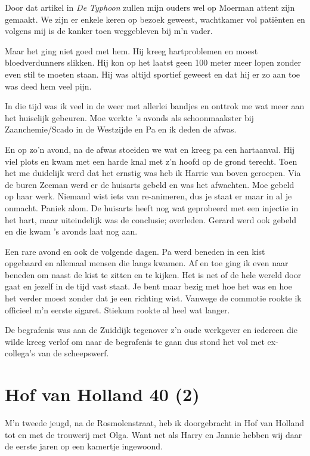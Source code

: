 \documentclass[10pt,twoside,openright]{memoir}
\begin{document}
Door dat artikel in \emph{De Typhoon} zullen mijn ouders wel op Moerman attent zijn gemaakt. We zijn er enkele keren op bezoek geweest, wachtkamer vol patiënten en volgens mij is de kanker toen weggebleven bij m’n vader. 

Maar het ging niet goed met hem. Hij kreeg hartproblemen en moest bloedverdunners slikken. Hij kon op het laatst geen 100 meter meer lopen zonder even stil te moeten staan. Hij was altijd sportief geweest en dat hij er zo aan toe was deed hem veel pijn.

In die tijd was ik veel in de weer met allerlei bandjes en onttrok me wat meer aan het huiselijk gebeuren. Moe werkte ’s avonds als schoonmaakster bij Zaanchemie/Scado in de Westzijde en Pa en ik deden de afwas. 

En op zo’n avond, na de afwas stoeiden we wat en kreeg pa een hartaanval. Hij viel plots en kwam met een harde knal met z’n hoofd op de grond terecht. Toen het me duidelijk werd dat het ernstig was heb ik Harrie van boven geroepen. Via de buren Zeeman werd er de huisarts gebeld en was het afwachten. Moe gebeld op haar werk. Niemand wist iets van re-animeren, dus je staat er maar in al je onmacht. Paniek alom. De huisarts heeft nog wat geprobeerd met een injectie in het hart, maar uiteindelijk was de conclusie; overleden. Gerard werd ook gebeld en die kwam ’s avonds laat nog aan. 

Een rare avond en ook de volgende dagen. Pa werd beneden in een kist opgebaard en allemaal mensen die langs kwamen. Af en toe ging ik even naar beneden om naast de kist te zitten en te kijken. Het is net of de hele wereld door gaat en jezelf in de tijd vast staat. Je bent maar bezig met hoe het was en hoe het verder moest zonder dat je een richting wist. Vanwege de commotie rookte ik officieel m’n eerste sigaret. Stiekum rookte al heel wat langer.

De begrafenis was aan de Zuiddijk tegenover z’n oude werkgever en iedereen die wilde kreeg verlof om naar de begrafenis te gaan dus stond het vol met ex-collega’s van de scheepswerf. 

\chapter{Hof van Holland 40 (2)} %
\label{cha:hofvanholland2}

M’n tweede jeugd, na de Rosmolenstraat, heb ik doorgebracht in Hof van Holland tot en met de trouwerij met Olga. Want net als Harry en Jannie hebben wij daar de eerste jaren op een kamertje ingewoond.
\end{document}
